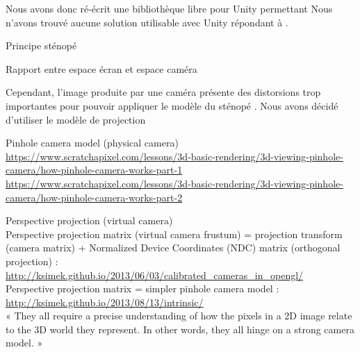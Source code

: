 Nous avons donc ré-écrit une bibliothèque libre pour Unity permettant 
Nous n'avons trouvé aucune solution utilisable avec Unity répondant à .

Principe sténopé

Rapport entre espace écran et espace caméra

Cependant, l'image produite par une caméra  présente des distorsions trop importantes pour pouvoir appliquer le modèle du sténopé . Nous avons décidé d'utiliser le modèle de projection 



Pinhole camera model (physical camera)\\
\url{https://www.scratchapixel.com/lessons/3d-basic-rendering/3d-viewing-pinhole-camera/how-pinhole-camera-works-part-1}\\
\url{https://www.scratchapixel.com/lessons/3d-basic-rendering/3d-viewing-pinhole-camera/how-pinhole-camera-works-part-2}

Perspective projection (virtual camera)\\
Perspective projection matrix (virtual camera frustum) = projection transform (camera matrix) + Normalized Device Coordinates (NDC) matrix (orthogonal projection) : \url{http://ksimek.github.io/2013/06/03/calibrated_cameras_in_opengl/}\\
Perspective projection matrix = simpler pinhole camera model : \url{http://ksimek.github.io/2013/08/13/intrinsic/}\\
« They all require a precise understanding of how the pixels in a 2D image relate to the 3D world they represent. In other words, they all hinge on a strong camera model. »

